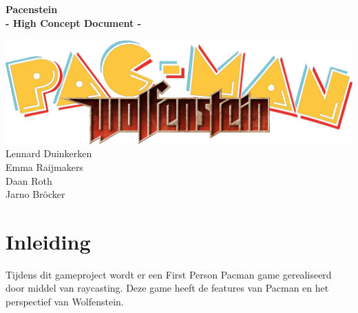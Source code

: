 \documentclass{article}
\begin{document}
\begin{titlepage}
    \centering
    \vfill
    \bfseries\Huge{Pacenstein\\\large{- High Concept Document -}}\\
    \normalfont\normalsize{}
    \vfill

    \includegraphics[width=\textwidth]{../res/pacenstein.png}
    \vfill
    \large{
        Lennard Duinkerken\\
        Emma Raijmakers\\
        Daan Roth\\
        Jarno Bröcker
    }
    \vfill
\end{titlepage}

\newpage
\tableofcontents
\newpage

\section*{Inleiding} %
\label{sec:inleiding}
Tijdens dit gameproject wordt er een First Person Pacman game gerealiseerd door middel van raycasting. Deze game heeft de features van Pacman en het perspectief van Wolfenstein.
\end{document}
